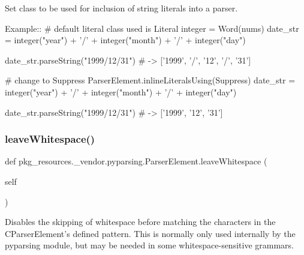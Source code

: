 \begin{DoxyVerb}Set class to be used for inclusion of string literals into a parser.

Example::
    # default literal class used is Literal
    integer = Word(nums)
    date_str = integer("year") + '/' + integer("month") + '/' + integer("day")           

    date_str.parseString("1999/12/31")  # -> ['1999', '/', '12', '/', '31']


    # change to Suppress
    ParserElement.inlineLiteralsUsing(Suppress)
    date_str = integer("year") + '/' + integer("month") + '/' + integer("day")           

    date_str.parseString("1999/12/31")  # -> ['1999', '12', '31']
\end{DoxyVerb}
 \mbox{\label{classpkg__resources_1_1__vendor_1_1pyparsing_1_1ParserElement_a8e5f94959acd269bf7ac67458755913a}} 
\subsubsection{\texorpdfstring{leave\+Whitespace()}{leaveWhitespace()}}
{\footnotesize\ttfamily def pkg\+\_\+resources.\+\_\+vendor.\+pyparsing.\+Parser\+Element.\+leave\+Whitespace (\begin{DoxyParamCaption}\item[{}]{self }\end{DoxyParamCaption})}

\begin{DoxyVerb}Disables the skipping of whitespace before matching the characters in the
C{ParserElement}'s defined pattern.  This is normally only used internally by
the pyparsing module, but may be needed in some whitespace-sensitive grammars.
\end{DoxyVerb}
 \mbox{\label{classpkg__resources_1_1__vendor_1_1pyparsing_1_1ParserElement_ac13ecd02ff2ecec127dcc7e1cc94311c}} 
